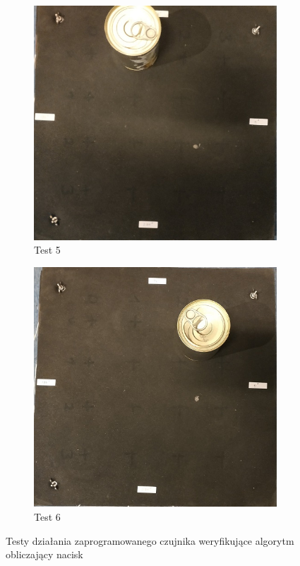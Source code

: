 \begin{figure} [!h]
  \begin{subfigure}[b]{0.5\linewidth}
    \centering
    \includegraphics[width=0.75\linewidth]{img/badanie0_5.jpg}
    \caption{Test 5}
  \end{subfigure}%
  \begin{subfigure}[b]{0.5\linewidth}
    \centering
    \includegraphics[width=0.75\linewidth]{img/badanie0_6.jpg}
    \caption{Test 6}
  \end{subfigure} 
  \centering
  \caption{Testy działania zaprogramowanego czujnika weryfikujące algorytm obliczający nacisk}
  \label{f_badanie0_pomiary} 
\end{figure}

